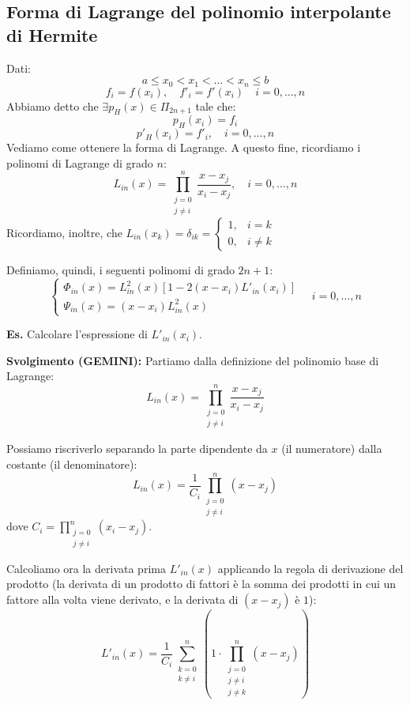 \vspace{0.6cm}
\subsection*{Forma di Lagrange del polinomio interpolante di Hermite}
Dati:
$$ a \le x_0 < x_1 < \dots < x_n \le b $$
$$ f_i = f(x_i), \quad f'_i = f'(x_i) \quad i=0, \dots, n $$
Abbiamo detto che $\exists p_H(x) \in \Pi_{2n+1}$ tale che:
$$ p_H(x_i) = f_i $$
$$ p'_H(x_i) = f'_i, \quad i=0, \dots, n $$
Vediamo come ottenere la forma di Lagrange. A questo fine, ricordiamo i polinomi di Lagrange di grado $n$:
$$ L_{in}(x) = \prod_{\substack{j=0 \\ j \neq i}}^{n} \frac{x - x_j}{x_i - x_j}, \quad i=0, \dots, n $$
Ricordiamo, inoltre, che $L_{in}(x_k) = \delta_{ik} = \begin{cases} 1, & i=k \\ 0, & i \neq k \end{cases}$

Definiamo, quindi, i seguenti polinomi di grado $2n+1$:
\begin{equation} \label{eq:lagrange_hermite}
\begin{cases}
\Phi_{in}(x) = L_{in}^2(x) [1 - 2(x - x_i)L'_{in}(x_i)] \\
\Psi_{in}(x) = (x - x_i)L_{in}^2(x)
\end{cases} \quad i=0, \dots, n
\end{equation}

\textbf{Es.} Calcolare l'espressione di $L'_{in}(x_i)$.

\vspace{0.2 cm}
\textbf{Svolgimento (GEMINI):}
Partiamo dalla definizione del polinomio base di Lagrange:
$$ L_{in}(x) = \prod_{\substack{j=0 \\ j \neq i}}^{n} \frac{x - x_j}{x_i - x_j} $$

Possiamo riscriverlo separando la parte dipendente da $x$ (il numeratore) dalla costante (il denominatore):
$$ L_{in}(x) = \frac{1}{C_i} \prod_{\substack{j=0 \\ j \neq i}}^{n} (x - x_j) $$
dove $C_i = \prod_{\substack{j=0 \\ j \neq i}}^{n} (x_i - x_j)$.

Calcoliamo ora la derivata prima $L'_{in}(x)$ applicando la regola di derivazione del prodotto (la derivata di un prodotto di fattori è la somma dei prodotti in cui un fattore alla volta viene derivato, e la derivata di $(x-x_j)$ è $1$):
$$ L'_{in}(x) = \frac{1}{C_i} \sum_{\substack{k=0 \\ k \neq i}}^{n} \left( 1 \cdot \prod_{\substack{j=0 \\ j \neq i \\ j \neq k}}^{n} (x - x_j) \right) $$

